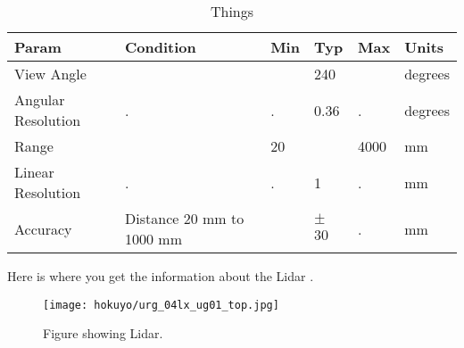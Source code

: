 \begin{table}
\begin{tabularx}{\textwidth}{|R||R|R|R|R|R|}
\hline
\textbf{Param}   &	\textbf{Condition} & \textbf{Min} & \textbf{Typ} & \textbf{Max} & \textbf{Units} \\	\hline\hline
View Angle 	         &                     &              & 240              &              & degrees        \\	\hline
Angular Resolution 	 & .                   & .            & 0.36             &  .           & degrees        \\	\hline
Range 	             &                     & 20           &                  & 4000         & mm             \\	\hline 
Linear Resolution    &  .                  & .            & 1                & .            & mm             \\	\hline 
Accuracy             & Distance 20 mm to 1000 mm &        & $\pm$ 30         &   .          & mm             \\	\hline 
\end{tabularx} 
\caption{Things}
\label{tab:lidar_params1}
\end{table}


Here is where you get the information about the Lidar \cite{urg_specs}.

\begin{figure}
\centering
\texttt{[image: hokuyo/urg\_04lx\_ug01\_top.jpg]}
\caption{Figure showing Lidar.}
\label{fig:lidar_top1}
\end{figure}


